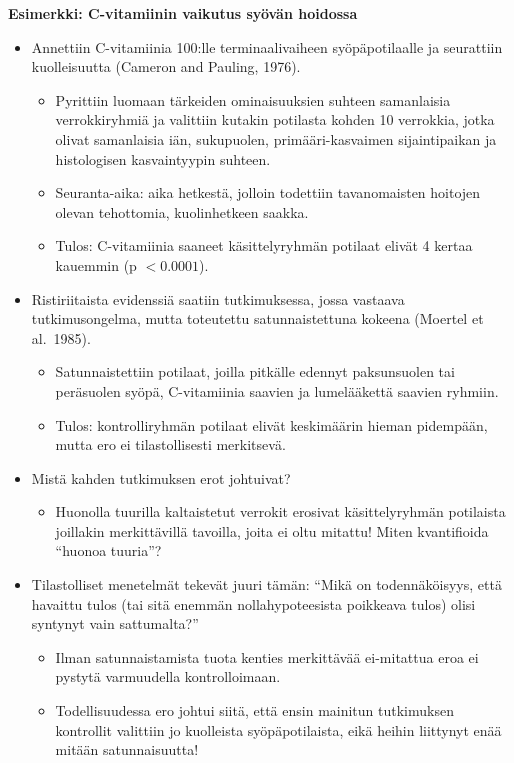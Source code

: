 \documentclass[
]{book}
\providecommand{\tightlist}{%
  \setlength{\itemsep}{0pt}\setlength{\parskip}{0pt}}
\begin{document}
\begin{eblock}{}

\textbf{Esimerkki: C-vitamiinin vaikutus syövän hoidossa}

\begin{itemize}
\tightlist
\item
  Annettiin C-vitamiinia 100:lle terminaalivaiheen syöpäpotilaalle ja
  seurattiin kuolleisuutta (Cameron and Pauling, 1976).

  \begin{itemize}
  \tightlist
  \item
    Pyrittiin luomaan tärkeiden ominaisuuksien suhteen samanlaisia verrokkiryhmiä ja valittiin kutakin potilasta kohden 10 verrokkia, jotka olivat samanlaisia iän, sukupuolen, primääri-kasvaimen sijaintipaikan ja histologisen kasvaintyypin suhteen.
  \item
    Seuranta-aika: aika hetkestä, jolloin todettiin tavanomaisten hoitojen olevan tehottomia, kuolinhetkeen saakka.
  \item
    Tulos: C-vitamiinia saaneet käsittelyryhmän potilaat elivät 4 kertaa kauemmin (p \(< 0.0001\)).
  \end{itemize}
\item
  Ristiriitaista evidenssiä saatiin tutkimuksessa, jossa vastaava tutkimusongelma, mutta toteutettu satunnaistettuna kokeena (Moertel et al.~1985).

  \begin{itemize}
  \tightlist
  \item
    Satunnaistettiin potilaat, joilla pitkälle edennyt paksunsuolen tai peräsuolen syöpä, C-vitamiinia saavien ja lumelääkettä saavien ryhmiin.
  \item
    Tulos: kontrolliryhmän potilaat elivät keskimäärin hieman pidempään, mutta ero ei tilastollisesti merkitsevä.
  \end{itemize}
\item
  Mistä kahden tutkimuksen erot johtuivat?

  \begin{itemize}
  \tightlist
  \item
    Huonolla tuurilla kaltaistetut verrokit erosivat käsittelyryhmän potilaista joillakin merkittävillä tavoilla, joita ei oltu mitattu! Miten kvantifioida ``huonoa tuuria''?
  \end{itemize}
\item
  Tilastolliset menetelmät tekevät juuri tämän: ``Mikä on todennäköisyys, että havaittu tulos (tai sitä enemmän nollahypoteesista poikkeava tulos) olisi syntynyt vain sattumalta?''

  \begin{itemize}
  \tightlist
  \item
    Ilman satunnaistamista tuota kenties merkittävää ei-mitattua eroa ei pystytä varmuudella kontrolloimaan.
  \item
    Todellisuudessa ero johtui siitä, että ensin mainitun tutkimuksen kontrollit valittiin jo kuolleista syöpäpotilaista, eikä heihin liittynyt enää mitään satunnaisuutta!
  \end{itemize}
\end{itemize}

\end{eblock}
\end{document}
